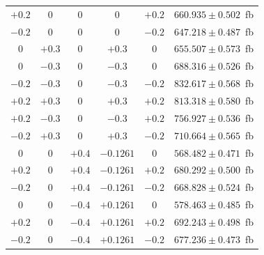 \begin{table}[!ht]
\begin{center}
\begin{tabular} {|c c c|c c|c|}
  $+0.2$      & 0              & 0                       & 0                & $+0.2$          &  $660.935\pm0.502$~fb \\
  $-0.2$      & 0              & 0                       & 0                & $-0.2$          &  $647.218\pm0.487$~fb \\
  0           & $+0.3$         & 0                       & $+0.3$           & 0               &  $655.507\pm0.573$~fb \\
  0           & $-0.3$         & 0                       & $-0.3$           & 0               &  $688.316\pm0.526$~fb \\
  $-0.2$      & $-0.3$         & 0                       & $-0.3$           & $-0.2$          &  $832.617\pm0.568$~fb \\
  $+0.2$      & $+0.3$         & 0                       & $+0.3$           & $+0.2$          &  $813.318\pm0.580$~fb \\
  $+0.2$      & $-0.3$         & 0                       & $-0.3$           & $+0.2$          &  $756.927\pm0.536$~fb \\
  $-0.2$      & $+0.3$         & 0                       & $+0.3$           & $-0.2$          &  $710.664\pm0.565$~fb \\
  \hline
  0           & 0              & $+0.4$                  & $-0.1261$         & 0               &  $568.482\pm0.471$~fb \\
  $+0.2$      & 0              & $+0.4$                  & $-0.1261$         & $+0.2$          &  $680.292\pm0.500$~fb \\
  $-0.2$      & 0              & $+0.4$                  & $-0.1261$         & $-0.2$          &  $668.828\pm0.524$~fb \\
  0           & 0              & $-0.4$                  & $+0.1261$         & 0               &  $578.463\pm0.485$~fb \\
  $+0.2$      & 0              & $-0.4$                  & $+0.1261$         & $+0.2$          &  $692.243\pm0.498$~fb \\
  $-0.2$      & 0              & $-0.4$                  & $+0.1261$         & $-0.2$          &  $677.236\pm0.473$~fb \\


\end{tabular}
\end{center}
\end{table}

